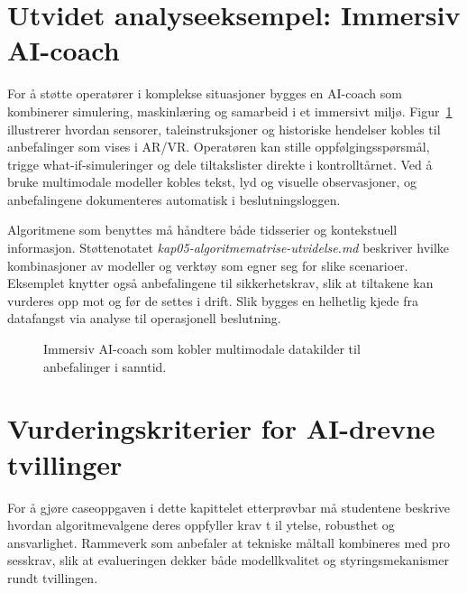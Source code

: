 \section{Utvidet analyseeksempel: Immersiv AI-coach}
For å støtte operatører i komplekse situasjoner bygges en AI-coach som kombinerer simulering, maskinlæring og samarbeid i et immersivt miljø. Figur~\ref{fig:kap05-operator-coach} illustrerer hvordan sensorer, taleinstruksjoner og historiske hendelser kobles til anbefalinger som vises i AR/VR. Operatøren kan stille oppfølgingsspørsmål, trigge what-if-simuleringer og dele tiltakslister direkte i kontrolltårnet. Ved å bruke multimodale modeller kobles tekst, lyd og visuelle observasjoner, og anbefalingene dokumenteres automatisk i beslutningsloggen.

Algoritmene som benyttes må håndtere både tidsserier og kontekstuell informasjon. Støttenotatet \textit{kap05-algoritmematrise-utvidelse.md} beskriver hvilke kombinasjoner av modeller og verktøy som egner seg for slike scenarioer. Eksemplet knytter også anbefalingene til sikkerhetskrav, slik at tiltakene kan vurderes opp mot \citet{iec62443-2-1} og \citet{eu2022nis2} før de settes i drift. Slik bygges en helhetlig kjede fra datafangst via analyse til operasjonell beslutning.

\begin{figure}[htbp]
    \centering
    \caption{Immersiv AI-coach som kobler multimodale datakilder til anbefalinger i sanntid.}
    \label{fig:kap05-operator-coach}
\end{figure}

\section{Vurderingskriterier for AI-drevne tvillinger}
For å gjøre caseoppgaven i dette kapittelet etterprøvbar må studentene beskrive hvordan algoritmevalgene deres oppfyller krav t
il ytelse, robusthet og ansvarlighet. Rammeverk som \citet{ec2020trustworthyai} anbefaler at tekniske måltall kombineres med pro
sesskrav, slik at evalueringen dekker både modellkvalitet og styringsmekanismer rundt tvillingen.


